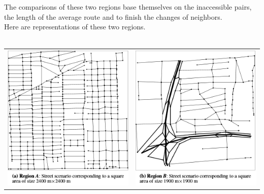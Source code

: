 The comparisons of these two regions base themselves on the inaccessible pairs, the length of the average route and to finish the changes of neighbors.\\

Here are representations of these two regions.\\\\

\begin{tabular}{cc}
   \includegraphics{../images/cityA.png} &
   \includegraphics{../images/cityB.png} \\
\end{tabular}



